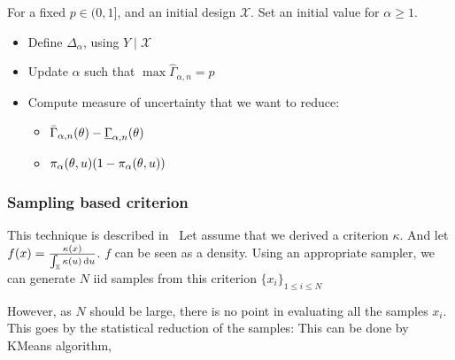 \documentclass[../../Main_ManuscritThese.tex]{subfiles}
\begin{document}
For a fixed $p\in (0, 1]$, and an initial design $\mathcal{X}$. Set an initial value for $\alpha \geq 1$. 
\begin{itemize}
\item Define $\Delta_{\alpha}$, using $Y \mid \mathcal{X}$
\item Update $\alpha$ such that $\max \hat{\Gamma}_{\alpha,n} = p$
\item Compute measure of uncertainty that we want to reduce:
  \begin{itemize}
  \item $\bar{\Gamma}_{\alpha,n}(\theta) - \underline{\Gamma}_{\alpha,n}(\theta)$
  \item $\pi_{\alpha}(\theta,u)(1-\pi_{\alpha}(\theta,u))$
  \end{itemize}
\end{itemize}

\subsubsection{Sampling based criterion}
\label{sec:sampling_based_criterion}
This technique is described in~\cite{dubourg_reliability-based_2011}
Let assume that we derived a criterion $\kappa$. And let $f(x) = \frac{\kappa(x)}{\int_{\mathbb{X}}\kappa(u)\,\mathrm{d}u}$. $f$ can be seen as a density.
  Using an appropriate sampler, we can generate $N$ iid samples from this criterion $\{x_i\}_{1\leq i \leq N}$
  
  However, as $N$ should be large, there is no point in evaluating all the samples $x_i$. This goes by the statistical reduction of the samples:
  This can be done by KMeans algorithm, 



\subfileLocal{
	\pagestyle{empty}
	
	
}
\end{document}
